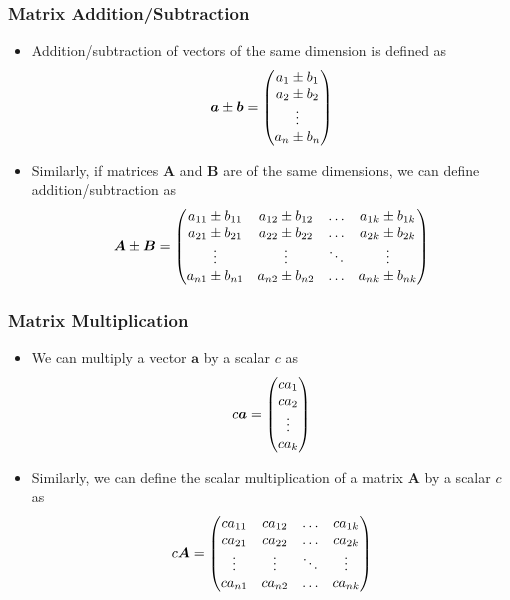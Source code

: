 \documentclass[pdflatex, 12pt]{beamer}
\begin{document}
\begin{frame}
\frametitle{Matrix Addition/Subtraction}
\begin{itemize}
\item Addition/subtraction of vectors of the same dimension is defined as
 \begin{equation}
 \bm{a} \pm \bm{b} = \begin{pmatrix}
 a_1 \pm b_1 \\
 a_2 \pm b_2 \\
 \vdots \\
 a_n \pm b_n \\
 \end{pmatrix} \notag
 \end{equation}
\item Similarly, if matrices $\bm{A}$ and $\bm{B}$ are of the same dimensions, we can define addition/subtraction as 
 \begin{equation}
 \bm{A} \pm \bm{B} = \begin{pmatrix}
 a_{11} \pm b_{11} & a_{12} \pm b_{12} & \ldots & a_{1k} \pm b_{1k} \\
 a_{21} \pm b_{21} & a_{22} \pm b_{22} & \ldots & a_{2k} \pm b_{2k} \\
 \vdots & \vdots & \ddots & \vdots \\
 a_{n1} \pm b_{n1} & a_{n2} \pm b_{n2} & \ldots & a_{nk} \pm b_{nk} \\
 \end{pmatrix} \notag
 \end{equation}
\end{itemize}
\end{frame}

\begin{frame}
\frametitle{Matrix Multiplication}
\begin{itemize}
\item We can multiply a vector $\bm{a}$ by a scalar $c$ as 
 \begin{equation}
 c\bm{a} = \begin{pmatrix}
 ca_1 \\
 ca_2 \\
 \vdots \\
 ca_k
 \end{pmatrix} \notag
 \end{equation}
\item Similarly, we can define the scalar multiplication of a matrix $\bm{A}$ by a scalar $c$ as
 \begin{equation}
 c\bm{A} = \begin{pmatrix}
 ca_{11} & ca_{12} & \ldots & ca_{1k} \\
 ca_{21} & ca_{22} & \ldots & ca_{2k} \\
 \vdots & \vdots & \ddots & \vdots \\
 ca_{n1} & ca_{n2} & \ldots & ca_{nk} \\
 \end{pmatrix} \notag
 \end{equation}
\end{itemize}
\end{frame}
\end{document}
